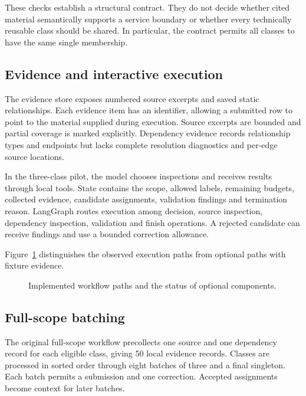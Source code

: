 These checks establish a structural contract. They do not decide whether cited material semantically supports a service boundary or whether every technically reusable class should be shared. In particular, the contract permits all classes to have the same single membership.

\subsection{Evidence and interactive execution}

The evidence store exposes numbered source excerpts and saved static relationships. Each evidence item has an identifier, allowing a submitted row to point to the material supplied during execution. Source excerpts are bounded and partial coverage is marked explicitly. Dependency evidence records relationship types and endpoints but lacks complete resolution diagnostics and per-edge source locations.

In the three-class pilot, the model chooses inspections and receives results through local tools. State contains the scope, allowed labels, remaining budgets, collected evidence, candidate assignments, validation findings and termination reason. LangGraph routes execution among decision, source inspection, dependency inspection, validation and finish operations. A rejected candidate can receive findings and use a bounded correction allowance.

Figure~\ref{fig:architecture} distinguishes the observed execution paths from optional paths with fixture evidence.

\begin{figure}[t]
\centering

\caption{Implemented workflow paths and the status of optional components.}
\label{fig:architecture}
\end{figure}


\subsection{Full-scope batching}

The original full-scope workflow precollects one source and one dependency record for each eligible class, giving 50 local evidence records. Classes are processed in sorted order through eight batches of three and a final singleton. Each batch permits a submission and one correction. Accepted assignments become context for later batches.

